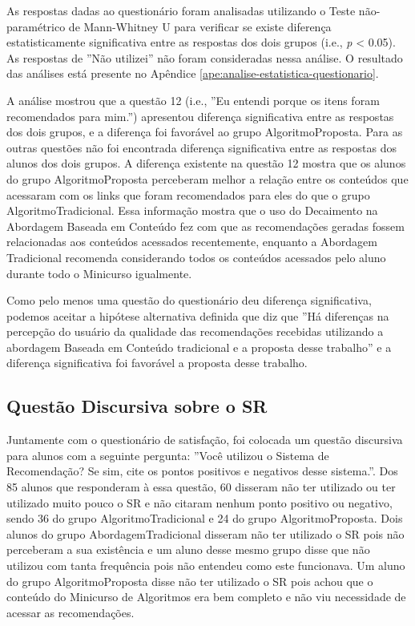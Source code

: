 As respostas dadas ao questionário foram analisadas utilizando o Teste não-paramétrico de
Mann-Whitney U para verificar se existe diferença estatisticamente significativa entre as respostas dos dois grupos (i.e., \textit{p} < 0.05).
As respostas de ''Não utilizei'' não foram consideradas nessa análise. O resultado das análises está presente no Apêndice
\ref{ape:analise-estatistica-questionario}.

A análise mostrou que a questão 12 (i.e., ''Eu entendi porque os itens foram recomendados para mim.'') apresentou
diferença significativa entre as respostas dos dois grupos, e a diferença foi favorável ao grupo AlgoritmoProposta.
Para as outras questões não foi encontrada diferença significativa entre as respostas dos
alunos dos dois grupos. A diferença existente na questão 12 mostra que os alunos do grupo AlgoritmoProposta perceberam
melhor a relação entre os conteúdos que acessaram com os links que foram recomendados para eles
do que o grupo AlgoritmoTradicional. Essa informação mostra que o uso do Decaimento na Abordagem
Baseada em Conteúdo fez com que as recomendações geradas fossem relacionadas aos conteúdos acessados recentemente,
enquanto a Abordagem Tradicional recomenda considerando todos os conteúdos acessados pelo aluno durante todo o Minicurso
igualmente.

Como pelo menos uma questão do questionário deu diferença significativa, podemos aceitar a hipótese alternativa definida
que diz que ''Há diferenças na percepção do usuário da qualidade das recomendações recebidas utilizando a abordagem
Baseada em Conteúdo tradicional e a proposta desse trabalho'' e a diferença significativa foi favorável a proposta desse trabalho.

\subsection{Questão Discursiva sobre o SR}\label{subsection:questao-aberta}

Juntamente com o questionário de satisfação, foi colocada um questão discursiva para alunos com a seguinte pergunta:
''Você utilizou o Sistema de Recomendação? Se sim, cite os pontos positivos e negativos desse sistema.''. Dos 85 alunos
que responderam à essa questão, 60 disseram não ter utilizado ou ter utilizado muito pouco o SR
e não citaram nenhum ponto positivo ou negativo, sendo 36 do grupo AlgoritmoTradicional
e 24 do grupo AlgoritmoProposta. Dois alunos do grupo AbordagemTradicional disseram
não ter utilizado o SR pois não perceberam a sua existência e um aluno desse mesmo grupo disse que não utilizou com tanta frequência
pois não entendeu como este funcionava. Um aluno do grupo AlgoritmoProposta disse não ter utilizado
o SR pois achou que o conteúdo do Minicurso de Algoritmos era bem completo e não viu necessidade de acessar as recomendações.

